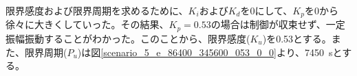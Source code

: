 \documentclass[a4j]{ujarticle}
\begin{document}
限界感度および限界周期を求めるために、$K_i$および$K_d$を0にして、$K_p$を0から徐々に大きくしていった。その結果、$K_p=0.53$の場合は制御が収束せず、一定振幅振動することがわかった。このことから、限界感度($K_u$)を0.53とする。また、限界周期($P_u$)は図\ref{scenario_5_e_86400_345600_053_0_0}より、7450~sとする。
\end{document}
